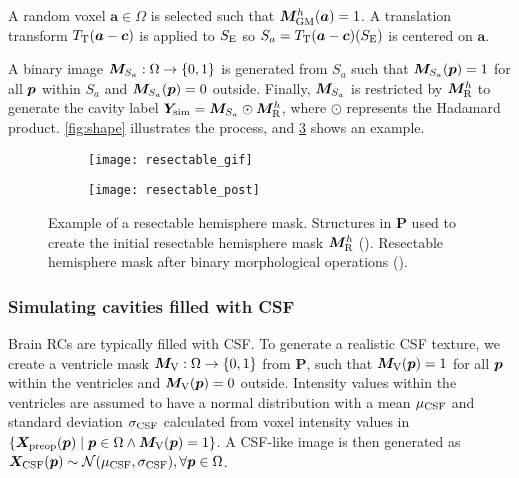 A random voxel $\bm{a} \in \Omega$ is selected such that $\bm{M}_{\text{GM}}^h(\bm{a}) = 1$.
A translation transform $T_{\text{T}}(\bm{a} - \bm{c})$ is applied to $S_{\text{E}}$ so $S_a = T_{\text{T}}(\bm{a} - \bm{c}) (S_{\text{E}})$ is centered on $\bm{a}$.

A binary image $\bm{M}_{S_a} : \Omega \to  \{ 0, 1 \}$ is generated from $S_a$ such that $\bm{M}_{S_a}(\bm{p}) = 1$ for all $\bm{p}$ within $S_a$ and $\bm{M}_{S_a}(\bm{p}) = 0$ outside.
Finally, $\bm{M}_{S_a}$ is restricted by $\bm{M}_{\text{R}}^h$ to generate the cavity label $\bm{Y}_{\text{sim}} = \bm{M}_{S_a} \odot \bm{M}_{\text{R}}^h$, where $\odot$ represents the Hadamard product.
\cref{fig:shape} illustrates the process, and \cref{fig:resectable} shows an example.


\begin{figure}
  \centering

  \begin{subfigure}{\textwidth}
      \texttt{[image: resectable\_gif]}
      \caption{\label{fig:resectable_sub1}}
  \end{subfigure}

  \begin{subfigure}{\textwidth}
      \texttt{[image: resectable\_post]}
      \caption{\label{fig:resectable_sub2}}
  \end{subfigure}

  \caption[Example of a resectable hemisphere mask]{
    Example of a resectable hemisphere mask.
    Structures in $\bm{P}$ used to create the initial resectable hemisphere mask $\bm{M}_{\text{R}}^h$ ().
    Resectable hemisphere mask after binary morphological operations ().
  }
  \label{fig:resectable}
\end{figure}



\subsubsection{Simulating cavities filled with CSF}
\label{sec:texture_cavity}

Brain \acp{RC} are typically filled with \ac{CSF}.
To generate a realistic \acs{CSF} texture,
we create a ventricle mask
${\bm{M}_{\text{V}} : \Omega \to \{ 0, 1 \}}$ from $\bm{P}$, such that
$\bm{M}_{\text{V}}(\bm{p}) = 1$ for all $\bm{p}$ within the ventricles and
$\bm{M}_{\text{V}}(\bm{p}) = 0$ outside.
Intensity values within the ventricles are assumed to have
a normal distribution \cite{gudbjartsson_rician_1995}
with a mean $\mu_{\text{CSF}}$ and standard deviation $\sigma_{\text{CSF}}$
calculated from voxel intensity values in
$\{ \bm{X}_{\text{preop}}(\bm{p}) \mid \bm{p} \in \Omega \land \bm{M}_{\text{V}}(\bm{p}) = 1 \}$.
A \acs{CSF}-like image is then generated as $\bm{X}_{\text{CSF}}(\bm{p}) \sim \mathcal{N} (\mu_{\text{CSF}}, \sigma_{\text{CSF}}), \forall \bm{p} \in \Omega$.


